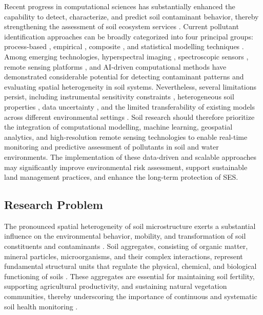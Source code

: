 \documentclass[sn-mathphys-num]{sn-jnl}
\begin{document}
Recent progress in computational sciences has substantially enhanced the capability to detect, characterize, and predict soil contaminant behavior, thereby strengthening the assessment of soil ecosystem services \cite{Liu2020,Zhang2021,Proshad2025,Lemenkova2025d}. Current pollutant identification approaches can be broadly categorized into four principal groups: process-based \cite{Giannakis2017,Karlen2019}, empirical \cite{Benavidez2018,Lal2020}, composite \cite{Sadhukhan2022}, and statistical modelling techniques \cite{Lu2020,Feng2024,Lemenkova2024b}. Among emerging technologies, hyperspectral imaging \cite{Fan2025,Shi2021}, spectroscopic sensors \cite{Xu2026,Guo2025}, remote sensing platforms \cite{Lemenkova2025b,Zhang2022}, and AI-driven computational methods \cite{Proshad2025,Lemenkova2025d,Feng2024,Li2023} have demonstrated considerable potential for detecting contaminant patterns and evaluating spatial heterogeneity in soil systems. Nevertheless, several limitations persist, including instrumental sensitivity constraints \cite{Rosskopfova2012}, heterogeneous soil properties \cite{Klaucol2017,Lemenkova2023}, data uncertainty \cite{Lu2020,Karlen2019,Li2023}, and the limited transferability of existing models across different environmental settings \cite{Benavidez2018,Zhang2021}. Soil research should therefore prioritize the integration of computational modelling, machine learning, geospatial analytics, and high-resolution remote sensing technologies to enable real-time monitoring and predictive assessment of pollutants in soil and water environments. The implementation of these data-driven and scalable approaches may significantly improve environmental risk assessment, support sustainable land management practices, and enhance the long-term protection of SES.

\subsection{Research Problem}\label{sec1.2}

The pronounced spatial heterogeneity of soil microstructure exerts a substantial influence on the environmental behavior, mobility, and transformation of soil constituents and contaminants \cite{Vogel2018}. Soil aggregates, consisting of organic matter, mineral particles, microorganisms, and their complex interactions, represent fundamental structural units that regulate the physical, chemical, and biological functioning of soils \cite{Six2004}. These aggregates are essential for maintaining soil fertility, supporting agricultural productivity, and sustaining natural vegetation communities, thereby underscoring the importance of continuous and systematic soil health monitoring \cite{Lal2015,Baveye2016,Lehmann2020}. 
\end{document}
